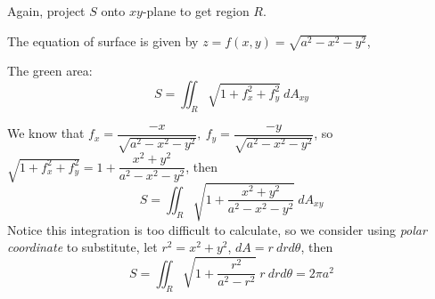 \begin{spacing}{1.3}
    \sol Again, project $S$ onto $xy$-plane to get region $R$.

    The equation of surface is given by $z=f(x,y)=\sqrt{a^2-x^2-y^2}$,
    
    The green area: $$S=\iint_R\sqrt{1+f_x^2+f_y^2}\ dA_{xy}$$

    We know that $f_x=\dfrac{-x}{\sqrt{a^2-x^2-y^2}},\ f_y=\dfrac{-y}{\sqrt{a^2-x^2-y^2}}$, so 
    $\sqrt{1+f_x^2+f_y^2}=1+\dfrac{x^2+y^2}{a^2-x^2-y^2}$, then
    $$S = \iint_R \sqrt{1+\dfrac{x^2+y^2}{a^2-x^2-y^2}}\ dA_{xy}$$
    Notice this integration is too difficult to calculate, so we consider using {\it polar coordinate}
    to substitute, let $r^2=x^2+y^2$, $dA=r\ drd\theta$, then 
    $$S = \iint_R \sqrt{1+\dfrac{r^2}{a^2-r^2}}\ r\ drd\theta=2\pi a^2$$

\end{spacing}
